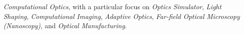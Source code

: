 \textit{Computational Optics}, with a particular focus on \textit{Optics Simulator}, \textit{Light Shaping}, \textit{Computational Imaging}, \textit{Adaptive Optics}, \textit{Far-field Optical Microscopy (Nanoscopy)}, and \textit{Optical Manufacturing}.